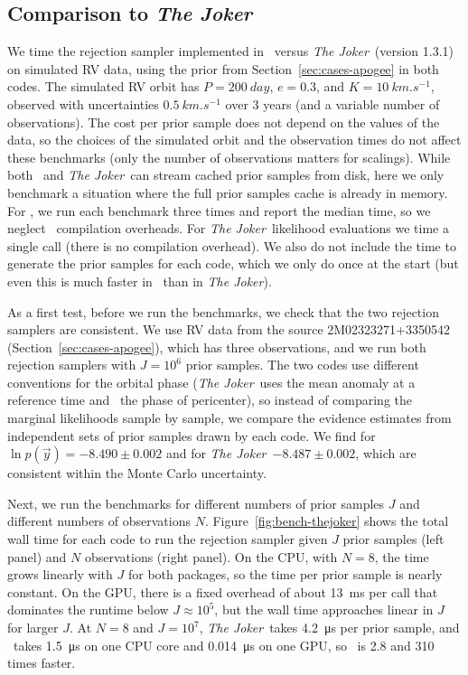 \documentclass[twocolumn]{AASTeX7/aastex701}
\newcommand{\harv}{\package{harv}}
\newcommand{\joker}{\textsl{The Joker}}
\begin{document}
\subsection{Comparison to \joker}

We time the rejection sampler implemented in \harv\ versus \joker\ (version 1.3.1) on
simulated RV data, using the prior from Section~\ref{sec:cases-apogee} in both codes.
The simulated RV orbit has $P = 200~\unit{day}$, $e = 0.3$, and $K =
10~\unit{km.s^{-1}}$, observed with uncertainties $0.5~\unit{km.s^{-1}}$ over 3 years
(and a variable number of observations).
The cost per prior sample does not depend on the values of the data, so the choices of
the simulated orbit and the observation times do not affect these benchmarks (only the
number of observations matters for scalings).
While both \harv\ and \joker\ can stream cached prior samples from disk, here we only
benchmark a situation where the full prior samples cache is already in memory.
For \harv, we run each benchmark three times and report the median time, so we
neglect \jax\ compilation overheads.
For \joker\ likelihood evaluations we time a single call (there is no compilation
overhead).
We also do not include the time to generate the prior samples for each code, which we
only do once at the start (but even this is much faster in \harv\ than in \joker).

As a first test, before we run the benchmarks, we check that the two rejection samplers
are consistent.
We use RV data from the source 2M02323271+3350542 (Section~\ref{sec:cases-apogee}),
which has three observations, and we run both rejection samplers with $J = 10^6$ prior
samples.
The two codes use different conventions for the orbital phase (\joker\ uses the mean
anomaly at a reference time and \harv\ the phase of pericenter), so instead of comparing
the marginal likelihoods sample by sample, we compare the evidence estimates from
independent sets of prior samples drawn by each code.
We find for \harv\ $\ln p(\vec{y}) = -8.490 \pm 0.002$ and for \joker\ $-8.487 \pm
0.002$, which are consistent within the Monte Carlo uncertainty.

Next, we run the benchmarks for different numbers of prior samples $J$ and different
numbers of observations $N$.
Figure~\ref{fig:bench-thejoker} shows the total wall time for each code to run the
rejection sampler given $J$ prior samples (left panel) and $N$ observations (right
panel).
On the CPU, with $N = 8$, the time grows linearly with $J$ for both packages, so the
time per prior sample is nearly constant.
On the GPU, there is a fixed overhead of about 13~\unit{ms} per call that
dominates the runtime below $J \approx 10^5$, but the wall time approaches linear in $J$
for larger $J$.
At $N = 8$ and $J = 10^7$, \joker\ takes 4.2~\unit{\micro\second} per prior
sample, and \harv\ takes 1.5~\unit{\micro\second} on one CPU core and
0.014~\unit{\micro\second} on one GPU, so \harv\ is 2.8 and 310
times faster.
\end{document}
